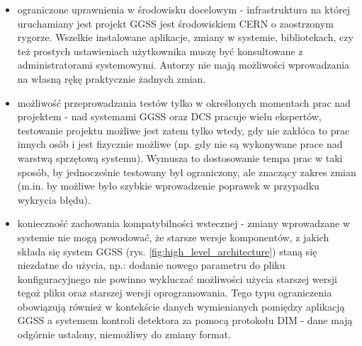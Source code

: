 \begin{itemize}
    \item ograniczone uprawnienia w środowisku docelowym - infrastruktura na której uruchamiany jest projekt GGSS jest środowiskiem CERN o zaostrzonym rygorze. Wszelkie instalowane aplikacje, zmiany w systemie, bibliotekach, czy też prostych ustawieniach użytkownika muszę być konsultowane z administratorami systemowymi. Autorzy nie mają możliwości wprowadzania na własną rękę praktycznie żadnych zmian.
    \item możliwość przeprowadzania testów tylko w określonych momentach prac nad projektem - nad systemami GGSS oraz DCS pracuje wielu ekspertów, testowanie projektu możliwe jest zatem tylko wtedy, gdy nie zakłóca to prac innych osób i jest fizycznie możliwe (np. gdy nie są wykonywane prace nad warstwą sprzętową systemu). Wymusza to dostosowanie tempa prac w taki sposób, by jednocześnie testowany był ograniczony, ale znaczący zakres zmian (m.in. by możliwe było szybkie wprowadzenie poprawek w przypadku wykrycia błędu).
    \item konieczność zachowania kompatybilności wstecznej - zmiany wprowadzane w systemie nie mogą powodować, że starsze wersje komponentów, z jakich składa się system GGSS (rys. \ref{fig:high_level_architecture}) staną się niezdatne do użycia, np.: dodanie nowego parametru do pliku konfiguracyjnego nie powinno wykluczać możliwości użycia starszej wersji tegoż pliku oraz starszej wersji oprogramowania. Tego typu ograniczenia obowiązują również w kontekście danych wymienianych pomiędzy aplikacją GGSS a systemem kontroli detektora za pomocą protokołu DIM - dane mają odgórnie ustalony, niemożliwy do zmiany format.
\end{itemize}

